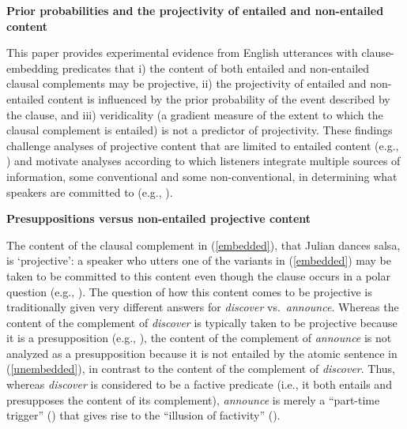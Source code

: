 \documentclass[12pt,fleqn]{article}
\newcommand{\6}{\mbox{$[\hspace*{-.6mm}[$}}
\newcommand{\9}{\mbox{$]\hspace*{-.6mm}]$}}
\begin{document}
 
 
\begin{center}
{\large \bf Prior probabilities and the projectivity of entailed and non-entailed content}
\end{center}

This paper provides experimental evidence from English utterances with clause-embedding predicates that i) the content of both entailed and non-entailed clausal complements may be projective, ii) the projectivity of entailed and non-entailed content is influenced by the prior probability of the event described by the clause, and iii) veridicality (a gradient measure of the extent to which the clausal complement is entailed) is not a predictor of projectivity. These findings challenge analyses of projective content that are limited to entailed content (e.g., \citealt{heim83,vds92}) and motivate analyses according to which listeners integrate multiple sources of information, some conventional and some non-conventional, in determining what speakers are committed to (e.g., \citealt{brst-salt10,brst-ar,abrusan2011,abrusan2016,tbd-variability}). 

{\bf Presuppositions versus non-entailed projective content} 

The content of the clausal complement in (\ref{embedded}), that Julian dances salsa, is `projective': a speaker who utters one of the variants in (\ref{embedded}) may be taken to be committed to this content even though the clause occurs in a polar question (e.g., \citealt{ccmg90}). The question of how this content comes to be projective is traditionally given very different answers for {\em discover} vs.\ {\em announce}. Whereas the content of the complement of {\em discover} is typically taken to be projective because it is a presupposition (e.g., \citealt{heim83,vds92}), the content of the complement of {\em announce} is not analyzed as a presupposition because it is not entailed by the atomic sentence in (\ref{unembedded}), in contrast to the content of the complement of {\em discover}. Thus, whereas {\em discover} is considered to be a factive predicate (i.e., it both entails and presupposes the content of its complement), {\em announce} is merely a ``part-time trigger'' (\citealt[139]{schlenker10}) that gives rise to the ``illusion of factivity'' (\citealt[76]{anand-hacquard2014}).
\end{document}
